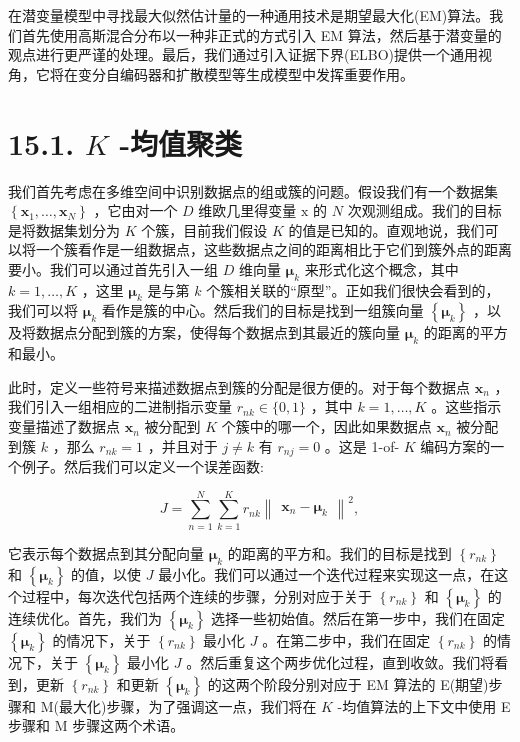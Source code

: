 \documentclass[10pt]{article}
\begin{document}
在潜变量模型中寻找最大似然估计量的一种通用技术是期望最大化(EM)算法。我们首先使用高斯混合分布以一种非正式的方式引入 EM 算法，然后基于潜变量的观点进行更严谨的处理。最后，我们通过引入证据下界(ELBO)提供一个通用视角，它将在变分自编码器和扩散模型等生成模型中发挥重要作用。

\section*{15.1. \(K\) -均值聚类}

我们首先考虑在多维空间中识别数据点的组或簇的问题。假设我们有一个数据集 \(\left\{  {{\mathbf{x}}_{1},\ldots ,{\mathbf{x}}_{N}}\right\}\) ，它由对一个 \(D\) 维欧几里得变量 \(\mathrm{x}\) 的 \(N\) 次观测组成。我们的目标是将数据集划分为 \(K\) 个簇，目前我们假设 \(K\) 的值是已知的。直观地说，我们可以将一个簇看作是一组数据点，这些数据点之间的距离相比于它们到簇外点的距离要小。我们可以通过首先引入一组 \(D\) 维向量 \({\mathbf{\mu }}_{k}\) 来形式化这个概念，其中 \(k = 1,\ldots ,K\) ，这里 \({\mathbf{\mu }}_{k}\) 是与第 \(k\) 个簇相关联的“原型”。正如我们很快会看到的，我们可以将 \({\mathbf{\mu }}_{k}\) 看作是簇的中心。然后我们的目标是找到一组簇向量 \(\left\{  {\mathbf{\mu }}_{k}\right\}\) ，以及将数据点分配到簇的方案，使得每个数据点到其最近的簇向量 \({\mathbf{\mu }}_{k}\) 的距离的平方和最小。

此时，定义一些符号来描述数据点到簇的分配是很方便的。对于每个数据点 \({\mathbf{x}}_{n}\) ，我们引入一组相应的二进制指示变量 \({r}_{nk} \in  \{ 0,1\}\) ，其中 \(k = 1,\ldots ,K\) 。这些指示变量描述了数据点 \({\mathbf{x}}_{n}\) 被分配到 \(K\) 个簇中的哪一个，因此如果数据点 \({\mathbf{x}}_{n}\) 被分配到簇 \(k\) ，那么 \({r}_{nk} = 1\) ，并且对于 \(j \neq  k\) 有 \({r}_{nj} = 0\) 。这是 1-of- \(K\) 编码方案的一个例子。然后我们可以定义一个误差函数:

\[
J = \mathop{\sum }\limits_{{n = 1}}^{N}\mathop{\sum }\limits_{{k = 1}}^{K}{r}_{nk}{\begin{Vmatrix}{\mathbf{x}}_{n} - {\mathbf{\mu }}_{k}\end{Vmatrix}}^{2}, \tag{15.1}
\]

它表示每个数据点到其分配向量 \({\mathbf{\mu }}_{k}\) 的距离的平方和。我们的目标是找到 \(\left\{  {r}_{nk}\right\}\) 和 \(\left\{  {\mathbf{\mu }}_{k}\right\}\) 的值，以使 \(J\) 最小化。我们可以通过一个迭代过程来实现这一点，在这个过程中，每次迭代包括两个连续的步骤，分别对应于关于 \(\left\{  {r}_{nk}\right\}\) 和 \(\left\{  {\mathbf{\mu }}_{k}\right\}\) 的连续优化。首先，我们为 \(\left\{  {\mathbf{\mu }}_{k}\right\}\) 选择一些初始值。然后在第一步中，我们在固定 \(\left\{  {\mathbf{\mu }}_{k}\right\}\) 的情况下，关于 \(\left\{  {r}_{nk}\right\}\) 最小化 \(J\) 。在第二步中，我们在固定 \(\left\{  {r}_{nk}\right\}\) 的情况下，关于 \(\left\{  {\mathbf{\mu }}_{k}\right\}\) 最小化 \(J\) 。然后重复这个两步优化过程，直到收敛。我们将看到，更新 \(\left\{  {r}_{nk}\right\}\) 和更新 \(\left\{  {\mathbf{\mu }}_{k}\right\}\) 的这两个阶段分别对应于 EM 算法的 E(期望)步骤和 M(最大化)步骤，为了强调这一点，我们将在 \(K\) -均值算法的上下文中使用 E 步骤和 M 步骤这两个术语。
\end{document}
